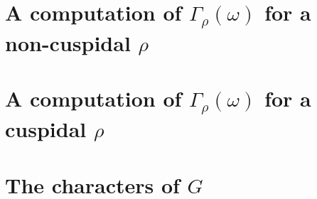 \documentclass[../main.tex]{subfiles}
\begin{document}
\section{A computation of \texorpdfstring{$\Gamma_\rho(\omega)$}{ Gamma rho(omega)} for a non-cuspidal \texorpdfstring{$\rho$}{ rho}}

\section{A computation of \texorpdfstring{$\Gamma_\rho(\omega)$}{ Gamma rho(omega)} for a cuspidal \texorpdfstring{$\rho$}{ rho}}

\section{The characters of \texorpdfstring{$G$}{ G}}
\end{document}

